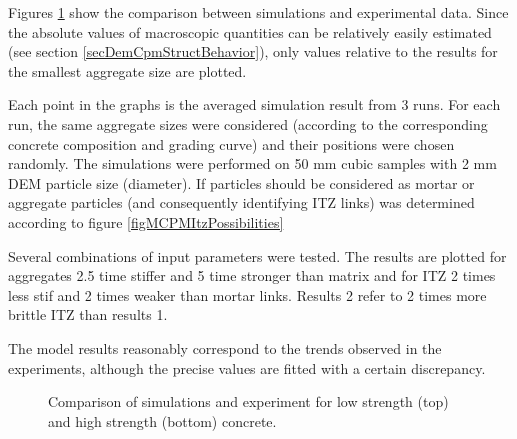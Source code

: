 Figures \ref{figMCPMValidation} show the comparison between simulations and experimental data.
Since the absolute values of macroscopic quantities can be relatively easily estimated (see section \ref{secDemCpmStructBehavior}), only values relative to the results for the smallest aggregate size are plotted.

Each point in the graphs is the averaged simulation result from 3 runs.
For each run, the same aggregate sizes were considered (according to the corresponding concrete composition and grading curve) and their positions were chosen randomly.
The simulations were performed on 50 mm cubic samples with 2 mm DEM particle size (diameter).
If particles should be considered as mortar or aggregate particles (and consequently identifying ITZ links) was determined according to figure \ref{figMCPMItzPossibilities}

Several combinations of input parameters were tested. The results are plotted for
aggregates 2.5 time stiffer and 5 time stronger than matrix
and for
ITZ 2 times less stif and 2 times weaker than mortar links.
Results 2 refer to 2 times more brittle ITZ than results 1.

The model results reasonably correspond to the trends observed in the experiments, although the precise values are fitted with a certain discrepancy.



\begin{figure}[htbp]
	\centering
	\caption[Comparison of simulations and experiment]{Comparison of simulations and experiment \cite{BeygiEtAl2014a,BeygiEtAl2014b,NikbinEtAl2014a} for low strength (top) and high strength (bottom) concrete.}
	\label{figMCPMValidation}
\end{figure}
